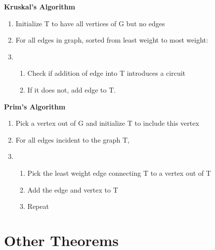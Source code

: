\documentclass{article}
\newcommand{\sub}[1]{\vspace{10pt}\textbf{#1}}
\begin{document}
\sub{Kruskal's Algorithm}
\begin{enumerate}
    \item Initialize T to have all vertices of G but no edges
    \item For all edges in graph, sorted from least weight to most weight:
    \item \begin{enumerate}
        \item Check if addition of edge into T introduces a circuit
        \item If it does not, add edge to T.
    \end{enumerate}
\end{enumerate}


\sub{Prim's Algorithm}
\begin{enumerate}
    \item Pick a vertex out of G and initialize T to include this vertex
    \item For all edges incident to the graph T,
    \item \begin{enumerate}
        \item Pick the least weight edge connecting T to a vertex out of T
        \item Add the edge and vertex to T
        \item Repeat
    \end{enumerate}
\end{enumerate}



\pagebreak
\section{Other Theorems}
\end{document}
